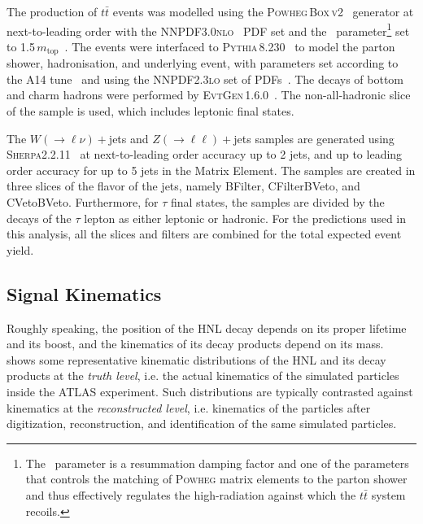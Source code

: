 The production of $t\bar{t}$ events was modelled using the \textsc{Powheg\,Box\,v2}~\cite{Frixione:2007nw,Nason:2004rx,Frixione:2007vw,Alioli:2010xd} generator at next-to-leading order with the \textsc{NNPDF3.0nlo}~\cite{Ball:2014uwa} PDF set and the \hdamp~parameter\footnote{The \hdamp~parameter is a resummation damping factor and one of the parameters that controls the matching of \textsc{Powheg} matrix elements to the parton shower and thus effectively regulates the high-\pT radiation against which the $t\bar{t}$ system recoils.} set to 1.5\,$m_{\mathrm{top}}$~\cite{ATL-PHYS-PUB-2016-020}.  The events were interfaced to \textsc{Pythia\,8.230}~\cite{Sjostrand:2014zea} to model the parton shower, hadronisation, and underlying event, with parameters set according to the A14 tune~\cite{ATL-PHYS-PUB-2014-021} and using the \textsc{NNPDF2.3lo} set of PDFs~\cite{Ball:2012cx}. The decays of bottom and charm hadrons were performed by \textsc{EvtGen\,1.6.0}~\cite{Lange:2001uf}. The non-all-hadronic slice of the sample is used, which includes leptonic final states.

The $W(\rightarrow \ell\nu)+$jets and $Z(\rightarrow \ell\ell)+$jets samples are generated using \textsc{Sherpa2.2.11}~\cite{Gleisberg:2008ta,Hoeche:2009rj,Bothmann:2019yzt} at next-to-leading order accuracy up to 2 jets, and up to leading order accuracy for up to 5 jets in the Matrix Element. The samples are created in three slices of the flavor of the jets, namely BFilter, CFilterBVeto, and CVetoBVeto. Furthermore, for $\tau$ final states, the samples are divided by the decays of the $\tau$ lepton as either leptonic or hadronic. For the predictions used in this analysis, all the slices and filters are combined for the total expected event yield.
 
\subsection{Signal Kinematics}
Roughly speaking, the position of the HNL decay depends on its proper lifetime and its boost, and the kinematics of its decay products depend on its mass.~ shows some representative kinematic distributions of the HNL and its decay products at the \textit{truth level}, i.e. the actual kinematics of the simulated particles inside the ATLAS experiment. Such distributions are typically contrasted against kinematics at the \textit{reconstructed level}, i.e. kinematics of the particles after digitization, reconstruction, and identification of the same simulated particles.

